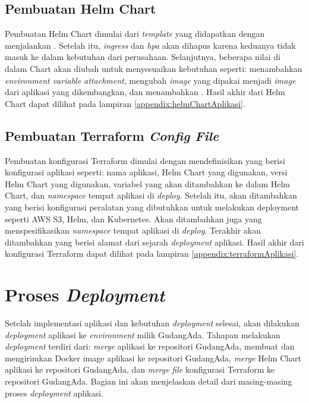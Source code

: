 \subsection{Pembuatan Helm Chart}
\label{sec:helm}

Pembuatan Helm Chart dimulai dari \textit{template} yang didapatkan dengan menjalankan . Setelah itu, \textit{ingress} dan \textit{hpa} akan dihapus karena keduanya tidak  masuk ke dalam kebutuhan dari perusahaan. Selanjutnya, beberapa nilai di dalam Chart akan diubah untuk menyesuaikan kebutuhan seperti: menambahkan \textit{environment variable attachment}, mengubah \textit{image} yang dipakai menjadi \textit{image} dari aplikasi yang dikembangkan, dan menambahkan . Hasil akhir dari Helm Chart dapat dilihat pada lampiran \ref{appendix:helmChartAplikasi}.

\subsection{Pembuatan Terraform \textit{Config File}}
\label{sec:terraform}

Pembuatan konfigurasi Terraform dimulai dengan mendefinisikan  yang berisi konfigurasi aplikasi seperti: nama aplikasi,  Helm Chart yang digunakan, versi Helm Chart yang digunakan, variabel yang akan ditambahkan ke dalam Helm Chart, dan \textit{namespace} tempat aplikasi di \textit{deploy}. Setelah itu, akan ditambahkan  yang berisi konfigurasi peralatan yang dibutuhkan untuk melakukan deployment seperti AWS S3, Helm, dan Kubernetes. Akan ditambahkan juga  yang menspesifikasikan \textit{namespace} tempat aplikasi di \textit{deploy}. Terakhir akan ditambahkan  yang berisi alamat dari sejarah \textit{deployment} aplikasi. Hasil akhir dari konfigurasi Terraform dapat dilihat pada lampiran \ref{appendix:terraformAplikasi}.

\section{Proses \textit{Deployment}}
\label{sec:prosesDeployment}

Setelah implementasi aplikasi dan kebutuhan \textit{deployment} selesai, akan dilakukan \textit{deployment} aplikasi ke \textit{environment} milik GudangAda. Tahapan melakukan \textit{deployment} terdiri dari: \textit{merge} aplikasi ke repositori GudangAda, membuat dan mengirimkan Docker image aplikasi ke repositori GudangAda, \textit{merge} Helm Chart aplikasi ke repositori GudangAda, dan \textit{merge} \textit{file} konfigurasi Terraform ke repositori GudangAda. Bagian ini akan menjelaskan detail dari masing-masing proses \textit{deployment} aplikasi.

